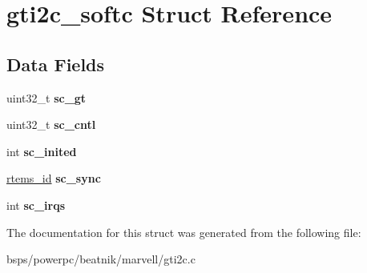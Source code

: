 \hypertarget{structgti2c__softc}{}\section{gti2c\+\_\+softc Struct Reference}
\label{structgti2c__softc}
\subsection*{Data Fields}
\begin{DoxyCompactItemize}
\item 
\mbox{\label{structgti2c__softc_a88a7bf4b96625e1d466134306cae87f6}} 
uint32\+\_\+t {\bfseries sc\+\_\+gt}
\item 
\mbox{\label{structgti2c__softc_ad196a4673de4c9a83a8ec207cf687c65}} 
uint32\+\_\+t {\bfseries sc\+\_\+cntl}
\item 
\mbox{\label{structgti2c__softc_a630cfe3e6ff286b7797063ffcf8094a8}} 
int {\bfseries sc\+\_\+inited}
\item 
\mbox{\label{structgti2c__softc_a943e33d2f303b202ef2252c00ed5a179}} 
\mbox{\hyperlink{group__ClassicTasks_gab20892b814dced7dd4e5b9bf42becd57}{rtems\+\_\+id}} {\bfseries sc\+\_\+sync}
\item 
\mbox{\label{structgti2c__softc_a928643e8314d75fbb2d05cd73659ed5b}} 
int {\bfseries sc\+\_\+irqs}
\end{DoxyCompactItemize}


The documentation for this struct was generated from the following file\+:\begin{DoxyCompactItemize}
\item 
bsps/powerpc/beatnik/marvell/gti2c.\+c\end{DoxyCompactItemize}
